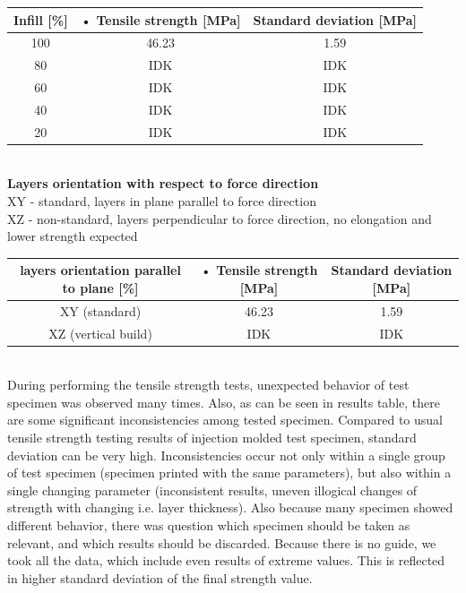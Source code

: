 \documentclass[a4paper, twoside, 11pt]{report}
\begin{document}
\begin{tabular}{|c|c|c|}
\hline 
Infill [\%] & • Tensile strength [MPa] & Standard deviation [MPa]\\ 
\hline 
100 & 46.23 & 1.59\\ 
\hline 
80 & IDK & IDK\\ 
\hline 
60 & IDK & IDK\\ 
\hline 
40 & IDK & IDK\\ 
\hline
20 & IDK & IDK\\ 
\hline 
\end{tabular}
\\[20pt]
%
\textbf{Layers orientation with respect to force direction}\\
XY - standard, layers in plane parallel to force direction\\
XZ - non-standard, layers perpendicular to force direction, no elongation and lower strength expected
\begin{tabular}{|c|c|c|}
\hline 
layers orientation parallel to plane [\%] & • Tensile strength [MPa] & Standard deviation [MPa]\\ 
\hline 
XY (standard) & 46.23 & 1.59\\ 
\hline 
XZ (vertical build) & IDK & IDK\\ 
\hline
\end{tabular}
\\[30pt]
During performing the tensile strength tests, unexpected behavior of test specimen was observed many times. Also, as can be seen in results table, there are some significant inconsistencies among tested specimen. Compared to usual tensile strength testing results of injection molded test specimen, standard deviation can be very high. Inconsistencies occur not only within a single group of test specimen (specimen printed with the same parameters), but also within a single changing parameter (inconsistent results, uneven illogical changes of strength with changing i.e. layer thickness). Also because many specimen showed different behavior, there was question which specimen should be taken as relevant, and which results should be discarded. Because there is no guide, we took all the data, which include even results of extreme values. This is reflected in higher standard deviation of the final strength value.
%
\end{document}
